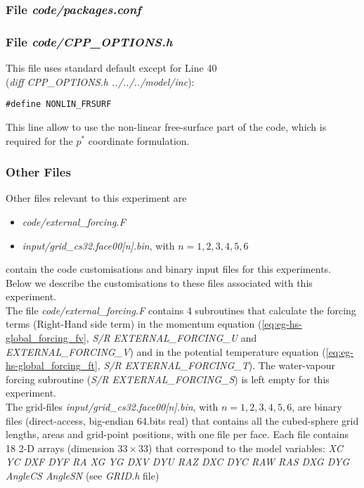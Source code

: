 \subsubsection{File {\it code/packages.conf}}



\subsubsection{File {\it code/CPP\_OPTIONS.h}}

This file uses standard default except for Line 40\\
({\it diff CPP\_OPTIONS.h ../../../model/inc}):
\begin{verbatim}
#define NONLIN_FRSURF 
\end{verbatim}
This line allow to use the non-linear free-surface part of the code,
which is required for the $p^*$ coordinate formulation.

\subsubsection{Other Files }

Other files relevant to this experiment are
\begin{itemize}
\item {\it code/external\_forcing.F}
\item {\it input/grid\_cs32.face00[n].bin}, with $n=1,2,3,4,5,6$
\end{itemize}
contain the code customisations and binary input files for this 
experiments. Below we describe the customisations
to these files associated with this experiment.\\

The file {\it code/external\_forcing.F} contains 4 subroutines
that calculate the forcing terms (Right-Hand side term) in the
momentum equation (\ref{eq:eg-hs-global_forcing_fv}, 
{\it S/R EXTERNAL\_FORCING\_U} and {\it EXTERNAL\_FORCING\_V})
and in the potential temperature equation 
(\ref{eq:eg-hs-global_forcing_ft}, {\it S/R  EXTERNAL\_FORCING\_T}). 
The water-vapour forcing subroutine ({\it S/R EXTERNAL\_FORCING\_S})
is left empty for this experiment.\\

The grid-files {\it input/grid\_cs32.face00[n].bin}, with $n=1,2,3,4,5,6$,
are binary files (direct-access, big-endian 64.bits real) that 
contains all the cubed-sphere grid lengths, areas and grid-point
positions, with one file per face.
Each file contains 18 2-D arrays (dimension $33 \times 33$) that correspond
to the model variables:
{\it 
XC YC DXF DYF RA XG YG DXV DYU RAZ DXC DYC RAW RAS DXG DYG AngleCS AngleSN 
}
(see {\it GRID.h} file)

